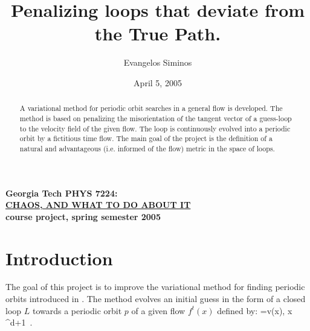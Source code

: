 \documentclass[pre,preprint,groupedaddress,showpacs,showkeys]{revtex4}
\begin{document}
				\title{
Penalizing loops that deviate from the True Path.
				}\author{
Evangelos Siminos				}
				\date{April 5, 2005} %

				\begin{abstract}
 A variational method for periodic orbit searches in a general flow is developed.
 The method is based on penalizing the misorientation of the tangent vector of a guess-loop to
 the velocity field of the given flow. The loop is continuously evolved into a periodic orbit 
 by a fictitious time flow. The main goal of the project is the definition of a natural and 
 advantageous (i.e. informed of the flow) metric in the space of loops.

\end{abstract}
					\maketitle

\noindent
{\bf Georgia Tech PHYS 7224:}\\
\underline{\bf CHAOS, AND WHAT TO DO ABOUT IT }\\
{\bf course project, spring semester 2005}

\section{Introduction}

 The goal of this project is to improve the variational method
 for finding periodic orbits introduced in .
 The method evolves an initial guess in the form of a closed loop $L$
 towards a periodic orbit $p$ of a given flow $f^t(x)$ defined by:
 \beq
    =v(x),\; x \in {}^{d+1}\, .
    \label{eq:flow}
 \eeq

 
\end{document}
